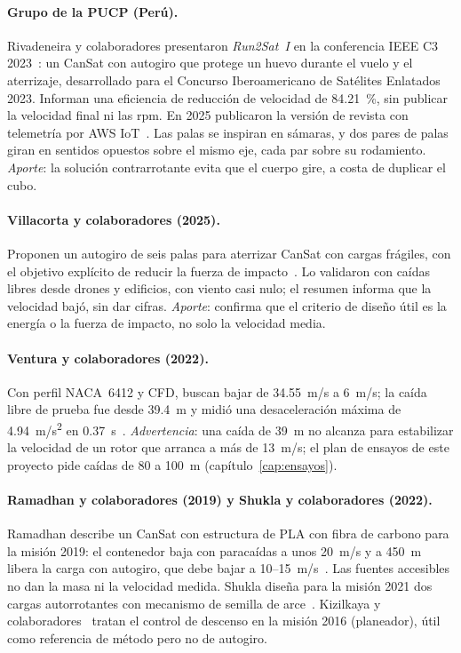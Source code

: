 \paragraph{Grupo de la PUCP (Perú).} Rivadeneira y colaboradores presentaron
\emph{Run2Sat~I} en la conferencia IEEE C3 2023~\cite{literatura-rivadeneira2023}: un
CanSat con autogiro que protege un huevo durante el vuelo y el aterrizaje, desarrollado
para el Concurso Iberoamericano de Satélites Enlatados 2023. Informan una eficiencia de
reducción de velocidad de \SI{84.21}{\percent}, sin publicar la velocidad final ni las
rpm. En 2025 publicaron la versión de revista con telemetría por AWS
IoT~\cite{literatura-rivadeneira2025}. Las palas se inspiran en sámaras, y dos pares de
palas giran en sentidos opuestos sobre el mismo eje, cada par sobre su rodamiento.
\emph{Aporte}: la solución contrarrotante evita que el cuerpo gire, a costa de duplicar
el cubo.

\paragraph{Villacorta y colaboradores (2025).} Proponen un autogiro de seis palas para
aterrizar CanSat con cargas frágiles, con el objetivo explícito de reducir la fuerza de
impacto~\cite{literatura-villacorta2025}. Lo validaron con caídas libres desde drones y
edificios, con viento casi nulo; el resumen informa que la velocidad bajó, sin dar cifras. \emph{Aporte}: confirma que el criterio de
diseño útil es la energía o la fuerza de impacto, no solo la velocidad media.

\paragraph{Ventura y colaboradores (2022).} Con perfil NACA~6412 y CFD, buscan bajar de
\SI{34.55}{m/s} a \SI{6}{m/s}; la caída libre de prueba fue desde \SI{39.4}{m} y midió
una desaceleración máxima de \SI{4.94}{m/s^2} en \SI{0.37}{s}~\cite{ventura2022}.
\emph{Advertencia}: una caída de \SI{39}{m} no alcanza para estabilizar la velocidad de
un rotor que arranca a más de \SI{13}{m/s}; el plan de ensayos de este proyecto pide
caídas de 80 a \SI{100}{m} (capítulo~\ref{cap:ensayos}).

\paragraph{Ramadhan y colaboradores (2019) y Shukla y colaboradores (2022).} Ramadhan
describe un CanSat con estructura de PLA con fibra de carbono para la misión 2019: el
contenedor baja con paracaídas a unos \SI{20}{m/s} y a \SI{450}{m} libera la carga con
autogiro, que debe bajar a 10--\SI{15}{m/s}~\cite{ramadhan2019}. Las fuentes accesibles
no dan la masa ni la velocidad medida. Shukla diseña para la misión 2021 dos cargas
autorrotantes con mecanismo de semilla de arce~\cite{literatura-shukla2022}. Kizilkaya y
colaboradores~\cite{literatura-kizilkaya2017} tratan el control de descenso en la misión
2016 (planeador), útil como referencia de método pero no de autogiro.

